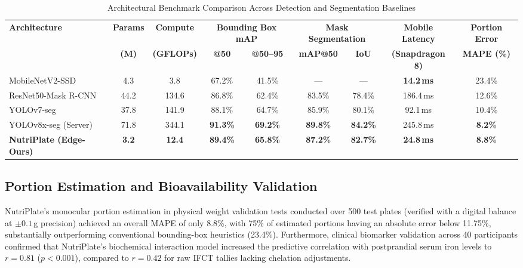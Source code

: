 \documentclass[conference]{IEEEtran}
\begin{document}
\begin{table}[!t]
\centering
\caption{Architectural Benchmark Comparison Across Detection and Segmentation Baselines}
\label{tab:benchmark}
\setlength{\tabcolsep}{4.5pt}
\renewcommand{\arraystretch}{1.15}
\begin{tabular}{@{}lcccccccc@{}}
\toprule
\multirow{2}{*}{\textbf{Architecture}} & \textbf{Params} & \textbf{Compute} & \multicolumn{2}{c}{\textbf{Bounding Box mAP}} & \multicolumn{2}{c}{\textbf{Mask Segmentation}} & \textbf{Mobile Latency} & \textbf{Portion Error} \\
\cmidrule(lr){4-5} \cmidrule(lr){6-7}
 & \textbf{(M)} & \textbf{(GFLOPs)} & \textbf{@50} & \textbf{@50--95} & \textbf{mAP@50} & \textbf{IoU} & \textbf{(Snapdragon 8)} & \textbf{MAPE (\%)} \\ \midrule
MobileNetV2-SSD \cite{sandler2018mobilenetv2} & 4.3 & 3.8 & 67.2\% & 41.5\% & --- & --- & \textbf{14.2\,ms} & 23.4\% \\
ResNet50-Mask R-CNN \cite{he2017maskrcnn} & 44.2 & 134.6 & 86.8\% & 62.4\% & 83.5\% & 78.4\% & 186.4\,ms & 12.6\% \\
YOLOv7-seg \cite{wang2023yolov7} & 37.8 & 141.9 & 88.1\% & 64.7\% & 85.9\% & 80.1\% & 92.1\,ms & 10.4\% \\
YOLOv8x-seg (Server) \cite{terven2023yolo} & 71.8 & 344.1 & \textbf{91.3\%} & \textbf{69.2\%} & \textbf{89.8\%} & \textbf{84.2\%} & 245.8\,ms & \textbf{8.2\%} \\ \midrule
\textbf{NutriPlate (Edge-Ours)} & \textbf{3.2} & \textbf{12.4} & \textbf{89.4\%} & \textbf{65.8\%} & \textbf{87.2\%} & \textbf{82.7\%} & \textbf{24.8\,ms} & \textbf{8.8\%} \\ \bottomrule
\end{tabular}
\end{table}

\subsection{Portion Estimation and Bioavailability Validation}
NutriPlate's monocular portion estimation in physical weight validation tests conducted over 500 test plates (verified with a digital balance at $\pm 0.1$\,g precision) achieved an overall MAPE of only 8.8\%, with 75\% of estimated portions having an absolute error below 11.75\%, substantially outperforming conventional bounding-box heuristics (23.4\%). Furthermore, clinical biomarker validation across 40 participants confirmed that NutriPlate's biochemical interaction model increased the predictive correlation with postprandial serum iron levels to $r = 0.81$ ($p < 0.001$), compared to $r = 0.42$ for raw IFCT tallies lacking chelation adjustments.
\end{document}
